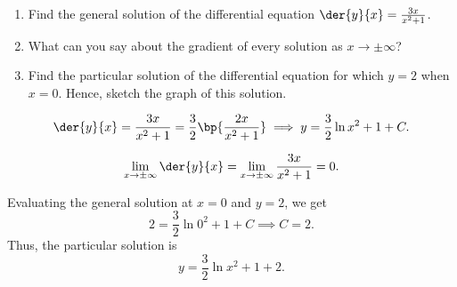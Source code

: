 \begin{problem}
    \begin{enumerate}
        \item Find the general solution of the differential equation $\der{y}{x} = \frac{3x}{x^2 + 1}$.
        \item What can you say about the gradient of every solution as $x \to \pm \infty$?
        \item Find the particular solution of the differential equation for which $y = 2$ when $x = 0$. Hence, sketch the graph of this solution.
    \end{enumerate}
\end{problem}
\begin{solution}
    \begin{ppart}
        \[\der{y}{x} = \frac{3x}{x^2 + 1} = \frac32 \bp{\frac{2x}{x^2 + 1}} \implies y = \frac32 \ln{x^2 + 1} + C.\]
    \end{ppart}
    \begin{ppart}
        \[\lim_{x \to \pm \infty} \der{y}{x} = \lim_{x \to \pm \infty} \frac{3x}{x^2 + 1} = 0.\]
    \end{ppart}
    \begin{ppart}
        Evaluating the general solution at $x = 0$ and $y = 2$, we get \[2 = \frac32 \ln{0^2 + 1} + C \implies C = 2.\] Thus, the particular solution is \[y = \frac32 \ln{x^2 + 1} + 2.\]

        \begin{center}
        \end{center}
    \end{ppart}
\end{solution}

